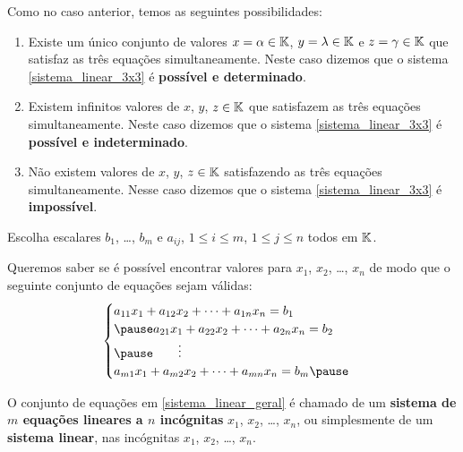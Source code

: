 \documentclass{beamer}
\begin{document}
    \begin{frame}
        Como no caso anterior, temos as seguintes possibilidades:\pause
        \begin{enumerate}[label={\roman*})]
            \item Existe um único conjunto de valores $x = \alpha \in \mathbb{K}$, $y = \lambda \in \mathbb{K}$ e $z = \gamma \in \mathbb{K}$ \pause que satisfaz as três equações simultaneamente. \pause Neste caso dizemos que o sistema \eqref{sistema_linear_3x3} \pause é \textbf{possível e determinado}.\pause

            \item Existem infinitos valores de $x$, $y$, $z \in \mathbb{K}$ \pause que satisfazem as três equações simultaneamente. \pause Neste caso dizemos que o sistema \eqref{sistema_linear_3x3} \pause é \textbf{possível e indeterminado}.\pause

            \item Não existem valores de $x$, $y$, $z \in \mathbb{K}$ \pause satisfazendo as três equações simultaneamente. \pause Nesse caso dizemos que o sistema \eqref{sistema_linear_3x3} \pause é \textbf{impossível}.
        \end{enumerate}
    \end{frame}

    \begin{frame}

        Escolha escalares $b_1$, \dots, $b_m$ \pause e $a_{ij}$, \pause $1 \le i \le m$, $1 \le j \le n$ todos em $\mathbb{K}$.

        \vspace{.3cm}

        Queremos saber se é possível encontrar valores para  $x_1$, $x_2$, \dots, $x_n$ \pause de modo que o seguinte conjunto de equações sejam válidas: \pause
        \begin{equation}\label{sistema_linear_geral}
            \begin{cases}
                a_{11}x_1 + a_{12}x_2 + \cdots + a_{1n}x_n = b_1\\\pause
                a_{21}x_1 + a_{22}x_2 + \cdots + a_{2n}x_n = b_2\\\pause
                \qquad \vdots\\
                a_{m1}x_1 + a_{m2}x_2 + \cdots + a_{mn}x_n = b_m\pause
            \end{cases}
        \end{equation}

        O conjunto de equações em \eqref{sistema_linear_geral} é chamado de um \pause \textbf{sistema de $m$ equações lineares \pause a $n$ inc\'ognitas} $x_1$, $x_2$, \dots, $x_n$\pause , ou simplesmente de um \textbf{sistema linear}, nas incógnitas \pause $x_1$, $x_2$, \dots, $x_n$.
    \end{frame}
\end{document}
